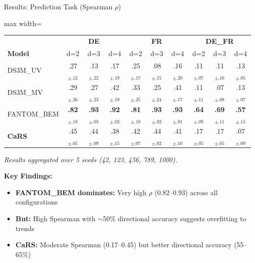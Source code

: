 \documentclass[aspectratio=169]{beamer}
\begin{document}
\begin{frame}{Results: Prediction Task (Spearman $\rho$)}
\begin{table}
\centering
\small
\begin{adjustbox}{max width=\textwidth}
\begin{tabular}{l|ccc|ccc|ccc}
\toprule
& \multicolumn{3}{c|}{\textbf{DE}} & \multicolumn{3}{c|}{\textbf{FR}} & \multicolumn{3}{c}{\textbf{DE\_FR}} \\
\textbf{Model} & d=2 & d=3 & d=4 & d=2 & d=3 & d=4 & d=2 & d=3 & d=4 \\
\midrule
DS3M\_UV & .27$_{\pm.12}$ & .13$_{\pm.22}$ & .17$_{\pm.19}$ & .25$_{\pm.17}$ & .08$_{\pm.15}$ & .16$_{\pm.20}$ & .11$_{\pm.07}$ & .11$_{\pm.10}$ & .13$_{\pm.05}$ \\
DS3M\_MV & .29$_{\pm.26}$ & .27$_{\pm.23}$ & .42$_{\pm.19}$ & .33$_{\pm.25}$ & .25$_{\pm.24}$ & .41$_{\pm.17}$ & .11$_{\pm.11}$ & .07$_{\pm.08}$ & .13$_{\pm.07}$ \\
FANTOM\_BEM & \textbf{.82}$_{\pm.18}$ & \textbf{.93}$_{\pm.03}$ & \textbf{.92}$_{\pm.03}$ & \textbf{.81}$_{\pm.18}$ & \textbf{.93}$_{\pm.02}$ & \textbf{.93}$_{\pm.01}$ & \textbf{.64}$_{\pm.09}$ & \textbf{.69}$_{\pm.11}$ & \textbf{.57}$_{\pm.15}$ \\
\midrule
\textbf{CaRS} & .45$_{\pm.05}$ & .44$_{\pm.09}$ & .38$_{\pm.15}$ & .42$_{\pm.07}$ & .44$_{\pm.02}$ & .41$_{\pm.10}$ & .17$_{\pm.05}$ & .17$_{\pm.05}$ & .07$_{\pm.09}$ \\
\bottomrule
\end{tabular}
\end{adjustbox}
\end{table}

{\scriptsize \textit{Results aggregated over 5 seeds (42, 123, 456, 789, 1000).}} %

\vspace{0.2cm}
\textbf{Key Findings:}
\begin{itemize}
    \item \textbf{FANTOM\_BEM dominates:} Very high $\rho$ (0.82--0.93) across all configurations
    \item \textbf{But:} High Spearman with $\sim$50\% directional accuracy suggests overfitting to trends
    \item \textbf{CaRS:} Moderate Spearman (0.17--0.45) but better directional accuracy (55--65\%)
\end{itemize}
\end{frame}
\end{document}
